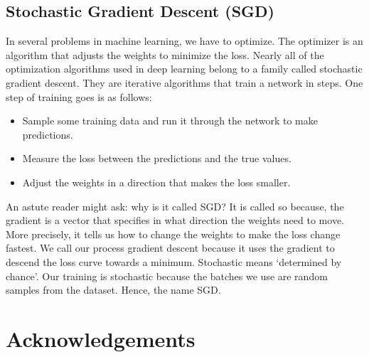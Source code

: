\documentclass[11pt]{article}
\begin{document}
\subsection{Stochastic Gradient Descent (SGD)} 


In several problems in machine learning, we have to optimize. The optimizer is an algorithm that adjusts the weights to minimize the loss. Nearly 
all of the optimization algorithms used in deep learning belong to a family called stochastic gradient descent. 
They are iterative algorithms that train a network in steps. One step of training goes is as follows:

\begin{itemize}
\item Sample some training data and run it through the network to make predictions.
\item Measure the loss between the predictions and the true values.
\item Adjust the weights in a direction that makes the loss smaller.
\end{itemize} 


An astute reader might ask: why is it called SGD? 
It is called so because, the gradient is a vector that specifies in what direction the weights need to move. 
More precisely, it tells us how to change the weights to make the loss change fastest. We call our process 
gradient descent because it uses the gradient to descend the loss curve towards a minimum. Stochastic means 
`determined by chance'. Our training is stochastic because the batches we use 
are random samples from the dataset. Hence, the name SGD. 




\section{Acknowledgements}


\appendix  
	
	\newpage
	
	
\end{document}
